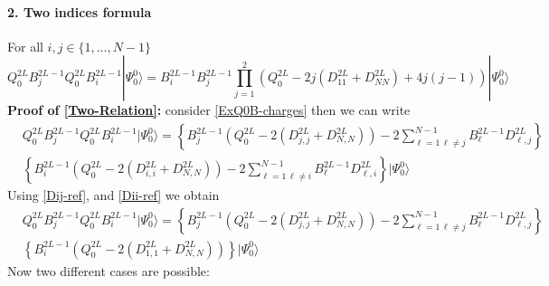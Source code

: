 \documentclass[10pt]{article}
\numberwithin{equation}{section}
\numberwithin{equation}{subsection}
\begin{document}
\paragraph{2. Two indices formula}
For all $i,j\in\{1,\ldots,N-1\}$
\begin{equation}\label{Two-Relation}
	Q_{0}^{2L}B_{j}^{2L-1}Q_{0}^{2L}B_{i}^{2L-1}|\Psi_{0}^{0}\rangle=B_{i}^{2L-1}B_{j}^{2L-1}\prod_{j=1}^{2}\left(Q_{0}^{2L}-2j(D_{11}^{2L}+D_{NN}^{2L})+4j(j-1)\right)|\Psi_{0}^{0}\rangle
\end{equation}
\textbf{Proof of \eqref{Two-Relation}:}
consider \eqref{ExQ0B-charges} then we can write 
\begin{align}
	&Q_{0}^{2L}B_{j}^{2L-1}Q_{0}^{2L}B_{i}^{2L-1}|\Psi_{0}^{0}\rangle=\left\{B_{j}^{2L-1}\left(Q_{0}^{2L}-2(D_{j,j}^{2L}+D_{N,N}^{2L})\right)-2\sum_{\ell=1\,\ell\neq j}^{N-1}B_{\ell}^{2L-1}D_{\ell,j}^{2L}\right\}\nonumber\\&\left\{B_{i}^{2L-1}\left(Q_{0}^{2L}-2(D_{i,i}^{2L}+D_{N,N}^{2L})\right)-2\sum_{\ell=1\,\ell\neq i}^{N-1}B_{\ell}^{2L-1}D_{\ell,i}^{2L}\right\}|\Psi_{0}^{0}\rangle
\end{align}
Using \eqref{Dij-ref}, and \eqref{Dii-ref} we obtain 
\begin{align}
	&Q_{0}^{2L}B_{j}^{2L-1}Q_{0}^{2L}B_{i}^{2L-1}|\Psi_{0}^{0}\rangle=\left\{B_{j}^{2L-1}\left(Q_{0}^{2L}-2(D_{j,j}^{2L}+D_{N,N}^{2L})\right)-2\sum_{\ell=1\,\ell\neq j}^{N-1}B_{\ell}^{2L-1}D_{\ell,j}^{2L}\right\}\nonumber\\&\left\{B_{i}^{2L-1}\left(Q_{0}^{2L}-2(D_{1,1}^{2L}+D_{N,N}^{2L})\right)\right\}|\Psi_{0}^{0}\rangle
\end{align}
Now two different cases are possible:
\end{document}
